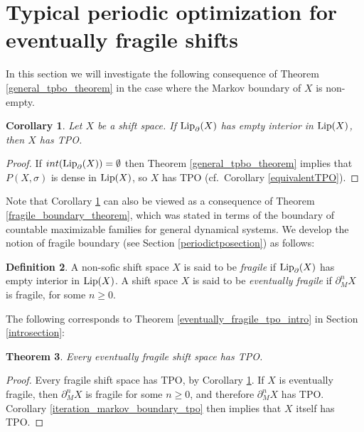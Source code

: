 \documentclass[reqno,11pt]{amsart}
\newtheorem{thm}{Theorem}[section]
\newtheorem{cor}[thm]{Corollary}
\theoremstyle{definition}
\newtheorem{defn}[thm]{Definition}
\theoremstyle{remark}
\theoremstyle{remark}
\def\lip{{\rm Lip}}
\numberwithin{equation}{section}
\begin{document}
\section{Typical periodic optimization for eventually fragile shifts}\label{specimen_section}


In this section we will investigate the following consequence
of Theorem \ref{general_tpbo_theorem} 
in the case where the Markov boundary of $X$ is non-empty.



\begin{cor}\label{lip_boundary_empty_interior}
Let $X$ be a shift space.
If $\lip_{\partial}(X)$ has empty interior in $\lip(X)$, then $X$ has TPO.
\end{cor}
\begin{proof}
If $ int( \lip_{\partial}(X))=\emptyset$ then 
Theorem \ref{general_tpbo_theorem} implies that
$P(X,\sigma)$ is dense in $\lip(X)$, so $X$ has TPO (cf.~Corollary \ref{equivalentTPO}).
\end{proof}

Note that Corollary \ref{lip_boundary_empty_interior} can also be viewed as a consequence
of Theorem \ref{fragile_boundary_theorem}, which was stated in terms of
the boundary of countable maximizable families for general dynamical systems. 
We develop the notion of fragile boundary (see Section \ref{periodictposection}) as follows:

\begin{defn}\label{fragile_defn}
A non-sofic shift space $X$ is said to be \emph{fragile} if 
 $\lip_{\partial}(X)$ has empty interior in $\lip(X)$.
A shift space $X$ is said to be \emph{eventually fragile} if $\partial_M^n X$ is fragile, for some $n\ge 0$.
\end{defn}

The following corresponds to Theorem \ref{eventually_fragile_tpo_intro} in Section \ref{introsection}:

\begin{thm}\label{eventually_fragile_tpo}
Every eventually fragile shift space has TPO.
\end{thm}
\begin{proof}
Every fragile shift space has TPO, by Corollary \ref{lip_boundary_empty_interior}.
If $X$ is eventually fragile, then $\partial_M^n X$ is fragile for some $n\ge 0$,
and therefore $\partial_M^n X$ has TPO.
Corollary \ref{iteration_markov_boundary_tpo} then implies that $X$ itself has TPO.
\end{proof}
\end{document}
